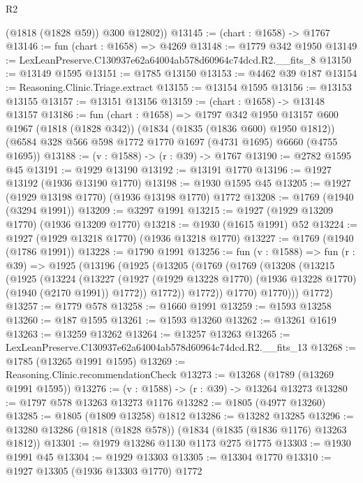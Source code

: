 \begin{lexlean}{R2}
\begin{coremodule}
        (@1818 (@1828 @59))
        @300
        @12802))
@13145 := (chart : @1658) -> @1767
@13146 := fun (chart : @1658) => @4269
@13148 := @1779 @342 @1950
@13149 := LexLeanPreserve.C130937e62a64004ab578d60964c74dcd.R2.__fits_8
@13150 := @13149 @1595
@13151 := @1785 @13150
@13153 := @4462 @39 @187
@13154 := Reasoning.Clinic.Triage.extract
@13155 := @13154 @1595
@13156 := @13153 @13155
@13157 := @13151 @13156
@13159 := (chart : @1658) -> @13148 @13157
@13186 := fun (chart : @1658) =>
  @1797
    @342
    @1950
    @13157
    @600
    @1967
    (@1818 (@1828 @342))
    (@1834 (@1835 (@1836 @600) @1950 @1812))
    (@6584 @328 @566 @598 @1772 @1770 @1697 (@4731 @1695) @6660 (@4755 @1695))
@13188 := (v : @1588) -> (r : @39) -> @1767
@13190 := @2782 @1595 @45
@13191 := @1929 @13190
@13192 := @13191 @1770
@13196 := @1927 @13192 (@1936 @13190 @1770)
@13198 := @1930 @1595 @45
@13205 := @1927 (@1929 @13198 @1770) (@1936 @13198 @1770) @1772
@13208 := @1769 (@1940 (@3294 @1991))
@13209 := @3297 @1991
@13215 := @1927 (@1929 @13209 @1770) (@1936 @13209 @1770)
@13218 := @1930 (@1615 @1991) @52
@13224 := @1927 (@1929 @13218 @1770) (@1936 @13218 @1770)
@13227 := @1769 (@1940 (@1786 @1991))
@13228 := @1790 @1991
@13256 := fun (v : @1588) =>
  fun (r : @39) =>
  @1925
    (@13196
      (@1925
        (@13205
          (@1769
            (@1769
              (@13208
                (@13215
                  (@1925
                    (@13224
                      (@13227
                        (@1927
                          (@1929 @13228 @1770)
                          (@1936 @13228 @1770)
                          (@1940 (@2170 @1991))
                          @1772))
                      @1772))
                  @1772))
              @1770)
            @1770)))
      @1772)
@13257 := @1779 @578
@13258 := @1660 @1991
@13259 := @1593 @13258
@13260 := @187 @1595
@13261 := @1593 @13260
@13262 := @13261 @1619
@13263 := @13259 @13262
@13264 := @13257 @13263
@13265 := LexLeanPreserve.C130937e62a64004ab578d60964c74dcd.R2.__fits_13
@13268 := @1785 (@13265 @1991 @1595)
@13269 := Reasoning.Clinic.recommendationCheck
@13273 := @13268 (@1789 (@13269 @1991 @1595))
@13276 := (v : @1588) -> (r : @39) -> @13264 @13273
@13280 := @1797 @578 @13263 @13273 @1176
@13282 := @1805 (@4977 @13260)
@13285 := @1805 (@1809 @13258) @1812
@13286 := @13282 @13285
@13296 := @13280 @13286 (@1818 (@1828 @578)) (@1834 (@1835 (@1836 @1176) @13263 @1812))
@13301 := @1979 @13286 @1130 @1173 @275 @1775
@13303 := @1930 @1991 @45
@13304 := @1929 @13303
@13305 := @13304 @1770
@13310 := @1927 @13305 (@1936 @13303 @1770) @1772

\end{coremodule}
\end{lexlean}
